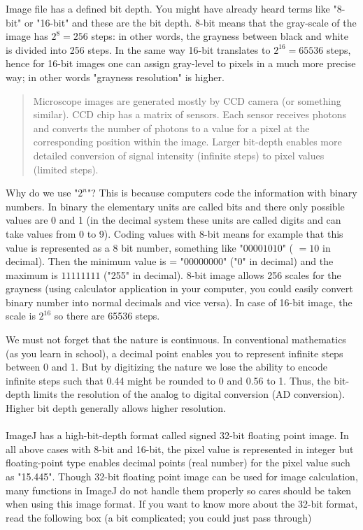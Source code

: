Image file has a defined bit depth. You might have already
heard terms like "8-bit" or
"16-bit" and these are the bit depth. 8-bit
means that the gray-scale of the image has $2^{8} = 256$
steps: in other words, the grayness between black and white is divided
into 256 steps. In the same way 16-bit translates to $2^{16} = 65536$ steps, hence for 16-bit images one can assign gray-level to pixels in a much more
precise way; in other words "grayness
resolution" is higher. 
\begin{quote}
Microscope images are generated
mostly by CCD camera (or something similar). 
CCD chip has a matrix of sensors. Each sensor receives
photons and converts the number of photons to a value for a
pixel at the corresponding position within the image. Larger bit-depth
enables more detailed conversion of signal intensity (infinite steps) to pixel values (limited steps).
 \end{quote}
Why do we use "$2^{n}$"? This
is because computers code the information with binary numbers. In binary the elementary units are called bits and there only possible values are 0 and 1 (in the decimal system these units are called digits and can take values from 0 to 9).
Coding values with 8-bit means for example that this value is represented as a 8 bit number, something like "$00001010$" ( $= 10$ in
decimal). Then the minimum value is =
"$00000000$" ("0" in decimal) and the maximum is $11111111$
("255" in decimal). 8-bit image allows 256
scales for the grayness (using calculator application in your computer,
you could easily convert binary number into normal decimals and vice
versa). In case of 16-bit image, the scale is $2^{16}$ so
there are 65536 steps. 


We must not forget that the nature is continuous. In conventional
mathematics (as you learn in school), a decimal point enables you to represent
infinite steps between 0 and 1. But by digitizing the nature we lose
the ability to encode infinite steps such that 0.44 might be rounded to 0 and 0.56 to
1. Thus, the bit-depth limits the resolution of the analog to digital
conversion (AD conversion). Higher bit depth generally allows higher
resolution.\\
\\
ImageJ has a high-bit-depth format called signed 32-bit floating point
image. In all above cases with 8-bit and 16-bit, the pixel value is
represented in integer but floating-point type enables decimal points
(real number) for the pixel value such as
"15.445". Though 32-bit floating point
image can be used for image calculation, many functions in ImageJ do
not handle them properly so cares should be taken when using this image format. If
you want to know more about the 32-bit format, read the following box
(a bit complicated; you could just pass through)

